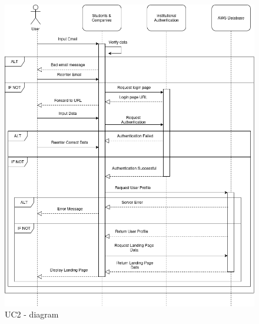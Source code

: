\begin{itemize}[label={[\textbf{UC}]}, align=left, leftmargin=*]
    \begin{figure}[H]
    	\includegraphics[width=\textwidth,height=\textheight,keepaspectratio]{RASD-Latex/assets/Use Case Diagrams/UC2.png}
    	\caption{UC2 - diagram}
    	\label{fig:DataRequest}
    \end{figure}
     

\end{itemize}
